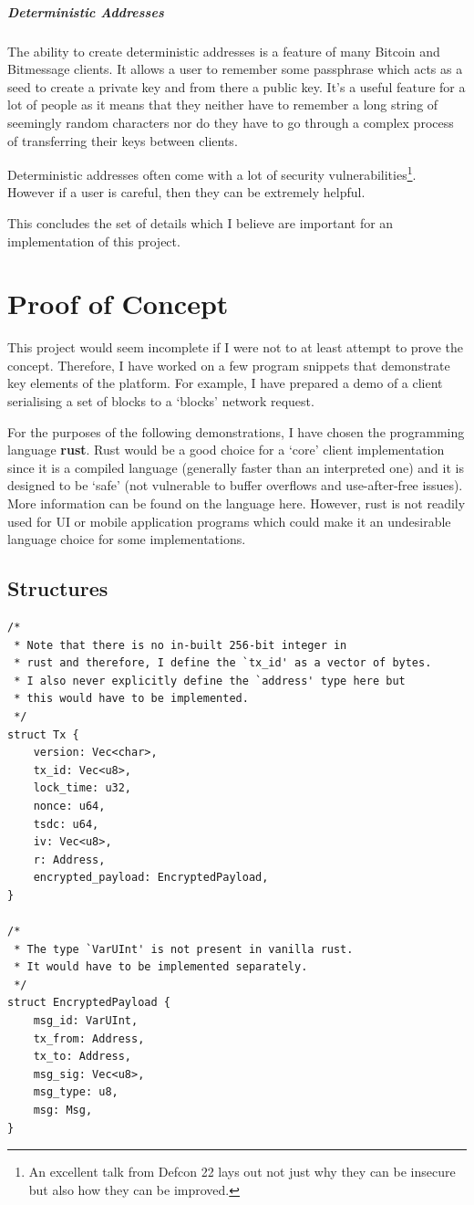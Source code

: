 \documentclass{article}
\begin{document}
\subparagraph{Deterministic Addresses}
The ability to create deterministic addresses is a feature of many Bitcoin and Bitmessage clients. It allows a user to remember some passphrase which acts as a seed to create a private key and from there a public key. It's a useful feature for a lot of people as it means that they neither have to remember a long string of seemingly random characters nor do they have to go through a complex process of transferring their keys between clients. 

Deterministic addresses often come with a lot of security vulnerabilities\footnote{An excellent talk\cite{defcon_22} from Defcon 22 lays out not just why they can be insecure but also how they can be improved.}. However if a user is careful, then they can be extremely helpful.

\vspace{1cm}
This concludes the set of details which I believe are important for an implementation of this project.




\newpage
\section{Proof of Concept}
This project would seem incomplete if I were not to at least attempt to prove the concept. Therefore, I have worked on a few program snippets that demonstrate key elements of the platform. For example, I have prepared a demo of a client serialising a set of blocks to a `blocks' network request.

For the purposes of the following demonstrations, I have chosen the programming language \textbf{rust}. Rust would be a good choice for a `core' client implementation since it is a compiled language (generally faster than an interpreted one) and it is designed to be `safe' (not vulnerable to buffer overflows and use-after-free issues). More information can be found on the language here\cite{rustlang}. However, rust is not readily used for UI or mobile application programs which could make it an undesirable language choice for some implementations.

\subsection{Structures}
\begin{verbatim}
/*
 * Note that there is no in-built 256-bit integer in 
 * rust and therefore, I define the `tx_id' as a vector of bytes.
 * I also never explicitly define the `address' type here but
 * this would have to be implemented.
 */
struct Tx {
    version: Vec<char>,
    tx_id: Vec<u8>,
    lock_time: u32,
    nonce: u64,
    tsdc: u64,
    iv: Vec<u8>,
    r: Address,
    encrypted_payload: EncryptedPayload,
}

/* 
 * The type `VarUInt' is not present in vanilla rust.
 * It would have to be implemented separately.
 */
struct EncryptedPayload {
    msg_id: VarUInt,
    tx_from: Address,
    tx_to: Address,
    msg_sig: Vec<u8>,
    msg_type: u8,
    msg: Msg,
}
\end{verbatim}
\end{document}
